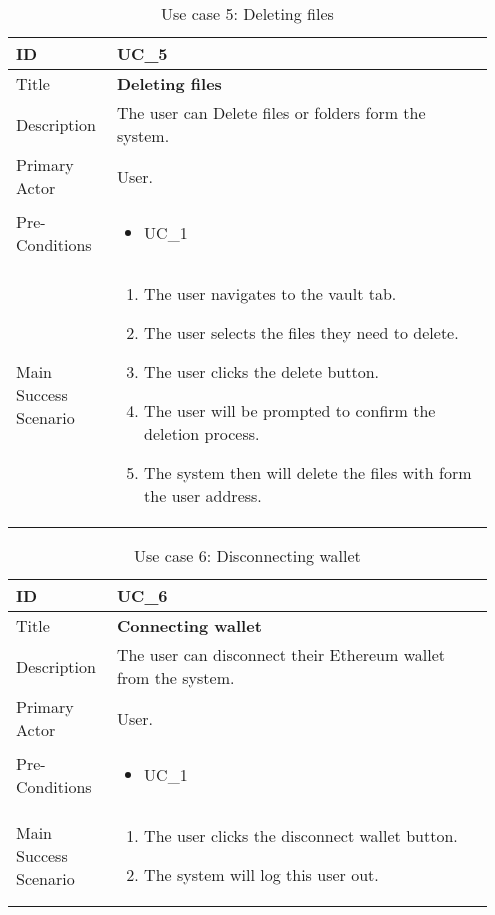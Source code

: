 \begin{longtable}{p{0.20\linewidth} | p{0.75\linewidth}}
  \caption{Use case 5: Deleting files}
  \label{tab:useCaseDelete}
  \\\toprule
  ID & UC\_5
  \\\midrule
  Title & \textbf{Deleting files}
  \\\hline
  Description & The user can Delete files or folders form the system.
  \\\hline
  Primary Actor & User.
  \\\hline
  Pre-Conditions & {
    \begin{itemize}
    \item UC\_1
    \end{itemize}
  }\vspace*{-\baselineskip}
  \\\hline
  Main Success Scenario & {
    \begin{enumerate}
    \item The user navigates to the vault tab.
    \item The user selects the files they need to delete.
    \item The user clicks the delete button.
    \item The user will be prompted to confirm the deletion process.
    \item The system then will delete the files with form the user address.
    \end{enumerate}
  }\vspace*{-\baselineskip}
  \\\bottomrule
\end{longtable}

\begin{longtable}{p{0.20\linewidth} | p{0.75\linewidth}}
  \caption{Use case 6: Disconnecting wallet}
  \label{tab:useCaseDisconnect}
  \\\toprule
  ID & UC\_6
  \\\midrule
  Title & \textbf{Connecting wallet}
  \\\hline
  Description & The user can disconnect their Ethereum wallet from the system.
  \\\hline
  Primary Actor & User.
  \\\hline
  Pre-Conditions & {
    \begin{itemize}
    \item UC\_1
    \end{itemize}
  }\vspace*{-\baselineskip}
  \\\hline
  Main Success Scenario & {
    \begin{enumerate}
    \item The user clicks the disconnect wallet button.
    \item The system will log this user out.
    \end{enumerate}
  }\vspace*{-\baselineskip}
  \\\bottomrule
\end{longtable}
